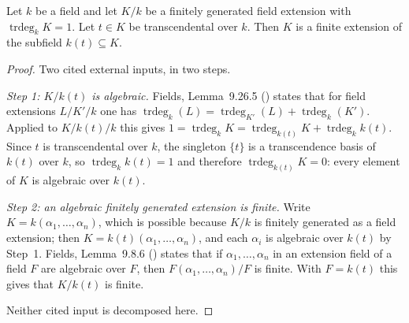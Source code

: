 \begin{lemma}
\label{lem:pcb-trdeg-one-finite}
Let \(k\) be a field and let \(K/k\) be a finitely generated field
extension with \(\operatorname{trdeg}_kK=1\).  Let \(t\in K\) be
transcendental over \(k\).  Then \(K\) is a finite extension of the
subfield \(k(t)\subseteq K\).
\end{lemma}
\begin{proof}
Two cited external inputs, in two steps.

\emph{Step 1: \(K/k(t)\) is algebraic.}  Fields, Lemma~9.26.5
() states that for field extensions \(L/K'/k\) one
has \(\operatorname{trdeg}_k(L)=\operatorname{trdeg}_{K'}(L)+
\operatorname{trdeg}_k(K')\).  Applied to \(K/k(t)/k\) this gives
\(1=\operatorname{trdeg}_kK=\operatorname{trdeg}_{k(t)}K+
\operatorname{trdeg}_kk(t)\).  Since \(t\) is transcendental over
\(k\), the singleton \(\{t\}\) is a transcendence basis of \(k(t)\)
over \(k\), so \(\operatorname{trdeg}_kk(t)=1\) and therefore
\(\operatorname{trdeg}_{k(t)}K=0\): every element of \(K\) is
algebraic over \(k(t)\).

\emph{Step 2: an algebraic finitely generated extension is finite.}
Write \(K=k(\alpha_1,\dots,\alpha_n)\), which is possible because
\(K/k\) is finitely generated as a field extension; then
\(K=k(t)(\alpha_1,\dots,\alpha_n)\), and each \(\alpha_i\) is
algebraic over \(k(t)\) by Step~1.  Fields, Lemma~9.8.6
() states that if \(\alpha_1,\dots,\alpha_n\) in
an extension field of a field \(F\) are algebraic over \(F\), then
\(F(\alpha_1,\dots,\alpha_n)/F\) is finite.  With \(F=k(t)\) this
gives that \(K/k(t)\) is finite.

Neither cited input is decomposed here.
\end{proof}

